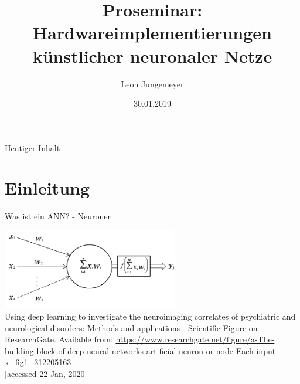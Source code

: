 \documentclass[handout]{beamer}
\title[Hardwareimplementierungen künstlicher neuronaler Netze]{Proseminar: Hardwareimplementierungen künstlicher neuronaler Netze}
\author{Leon Jungemeyer}
\date{30.01.2019}
\institute{Professur für Rechnerarchitektur und Parallelverarbeitung}
\begin{document}

    \begin{frame}
        \titlepage
    \end{frame}

    \begin{frame}{Heutiger Inhalt}
        \tableofcontents[sections={1-3}]
    \end{frame}

    \section{Einleitung}

    \begin{frame} {Was ist ein ANN? - Neuronen}
        \begin{center}
            \includegraphics[width=290px]{resources/ann-neuron.png} \\
            \tiny Using deep learning to investigate the neuroimaging correlates of psychiatric and neurological disorders: Methods and applications - Scientific Figure on ResearchGate.
            \tiny Available from: \href{https://www.researchgate.net/figure/a-The-building-block-of-deep-neural-networks-artificial-neuron-or-node-Each-input-x\_fig1\_312205163}{https://www.researchgate.net/figure/a-The-building-block-of-deep-neural-networks-artificial-neuron-or-node-Each-input-x\_fig1\_312205163} \\
            \tiny [accessed 22 Jan, 2020]
        \end{center}
    \end{frame}
\end{document}
